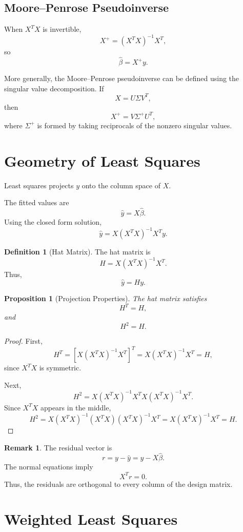\documentclass[12pt,oneside]{book}
\numberwithin{equation}{section}
\theoremstyle{definition}
\newtheorem{definition}{Definition}[section]
\newtheorem{remark}{Remark}[section]
\theoremstyle{plain}
\newtheorem{proposition}{Proposition}[section]
\theoremstyle{remark}
\begin{document}
\subsection{Moore--Penrose Pseudoinverse}

When $X^TX$ is invertible,
\[
X^+ = (X^TX)^{-1}X^T,
\]
so
\[
\hat{\beta}=X^+y.
\]

More generally, the Moore--Penrose pseudoinverse can be defined using the singular value decomposition. If
\[
X=U\Sigma V^T,
\]
then
\[
X^+=V\Sigma^+U^T,
\]
where $\Sigma^+$ is formed by taking reciprocals of the nonzero singular values.

\section{Geometry of Least Squares}

Least squares projects $y$ onto the column space of $X$.

The fitted values are
\[
\hat{y}=X\hat{\beta}.
\]
Using the closed form solution,
\[
\hat{y}
=
X(X^TX)^{-1}X^Ty.
\]

\begin{definition}[Hat Matrix]
The hat matrix is
\[
H
=
X(X^TX)^{-1}X^T.
\]
Thus,
\[
\hat{y}=Hy.
\]
\end{definition}

\begin{proposition}[Projection Properties]
The hat matrix satisfies
\[
H^T=H,
\]
and
\[
H^2=H.
\]
\end{proposition}

\begin{proof}
First,
\[
H^T
=
\left[X(X^TX)^{-1}X^T\right]^T
=
X(X^TX)^{-1}X^T
=
H,
\]
since $X^TX$ is symmetric.

Next,
\[
H^2
=
X(X^TX)^{-1}X^T X(X^TX)^{-1}X^T.
\]
Since $X^TX$ appears in the middle,
\[
H^2
=
X(X^TX)^{-1}(X^TX)(X^TX)^{-1}X^T
=
X(X^TX)^{-1}X^T
=
H.
\]
\end{proof}

\begin{remark}
The residual vector is
\[
r=y-\hat{y}=y-X\hat{\beta}.
\]
The normal equations imply
\[
X^Tr=0.
\]
Thus, the residuals are orthogonal to every column of the design matrix.
\end{remark}

\section{Weighted Least Squares}
\end{document}
